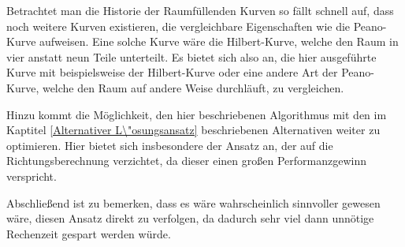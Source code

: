 \documentclass[course=asp]{aspdoc}
\begin{document}
Betrachtet man die Historie der Raumf\"ullenden Kurven so f\"allt schnell auf, dass noch weitere Kurven existieren, die vergleichbare Eigenschaften wie die Peano-Kurve aufweisen. Eine solche Kurve w\"are die Hilbert-Kurve, welche den Raum in vier anstatt neun Teile unterteilt. Es bietet sich also an, die hier ausgef\"uhrte Kurve mit beispielsweise der Hilbert-Kurve oder eine andere Art der Peano-Kurve, welche den Raum auf andere Weise durchl\"auft, zu vergleichen. %


Hinzu kommt die M\"oglichkeit, den hier beschriebenen Algorithmus mit den im Kaptitel \ref{Alternativer L\"osungsansatz} beschriebenen Alternativen weiter zu optimieren. Hier bietet sich insbesondere der Ansatz an, der auf die Richtungsberechnung verzichtet, da dieser einen gro\ss en Performanzgewinn verspricht.

Abschlie\ss end ist zu bemerken, dass es w\"are wahrscheinlich sinnvoller gewesen w\"are, diesen Ansatz direkt zu verfolgen, da dadurch sehr viel dann unn\"otige Rechenzeit gespart werden w\"urde.



\newpage

{}
\end{document}
